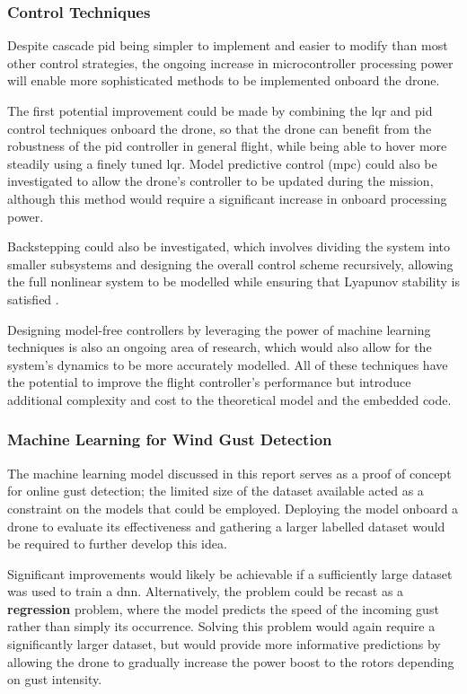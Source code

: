 \subsubsection{Control Techniques}

Despite cascade \gls{pid} being simpler to implement and easier to modify than most other control strategies, the ongoing increase in microcontroller processing power will enable more sophisticated methods to be implemented onboard the drone. 

The first potential improvement could be made by combining the \gls{lqr} and \gls{pid} control techniques onboard the drone, so that the drone can benefit from the robustness of the \gls{pid} controller in general flight, while being able to hover more steadily using a finely tuned \gls{lqr}. Model predictive control (\acrshort{mpc}) could also be investigated to allow the drone's controller to be updated during the mission, although this method would require a significant increase in onboard processing power. 

Backstepping could also be investigated, which involves dividing the system into smaller subsystems and designing the overall control scheme recursively, allowing the full nonlinear system to be modelled while ensuring that Lyapunov stability is satisfied \cite{4058900}. 

Designing model-free controllers by leveraging the power of machine learning techniques is also an ongoing area of research, which would also allow for the system's dynamics to be more accurately modelled. All of these techniques have the potential to improve the flight controller's performance but introduce additional complexity and cost to the theoretical model and the embedded code.

\subsubsection{Machine Learning for Wind Gust Detection}

The machine learning model discussed in this report serves as a proof of concept for online gust detection; the limited size of the dataset available acted as a constraint on the models that could be employed. Deploying the model onboard a drone to evaluate its effectiveness and gathering a larger labelled dataset would be required to further develop this idea. 

Significant improvements would likely be achievable if a sufficiently large dataset was used to train a \gls{dnn}. Alternatively, the problem could be recast as a \textbf{regression} problem, where the model predicts the speed of the incoming gust rather than simply its occurrence. Solving this problem would again require a significantly larger dataset, but would provide more informative predictions by allowing the drone to gradually increase the power boost to the rotors depending on gust intensity.



